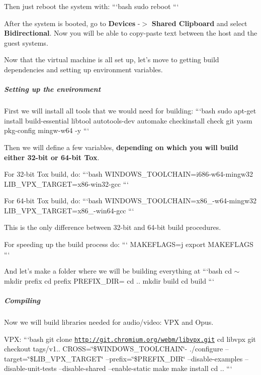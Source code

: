 Then just reboot the system with\+: ```bash sudo reboot ```

After the system is booted, go to {\bfseries Devices} -\/$>$ {\bfseries Shared Clipboard} and select {\bfseries Bidirectional}. Now you will be able to copy-\/paste text between the host and the guest systems.

Now that the virtual machine is all set up, let's move to getting build dependencies and setting up environment variables.

\label{_windows-cross-compile-environment}%
 \subparagraph*{Setting up the environment}

First we will install all tools that we would need for building\+: ```bash sudo apt-\/get install build-\/essential libtool autotools-\/dev automake checkinstall check git yasm pkg-\/config mingw-\/w64 -\/y ```

Then we will define a few variables, {\bfseries depending on which you will build either 32-\/bit or 64-\/bit Tox}.

For 32-\/bit Tox build, do\+: ```bash W\+I\+N\+D\+O\+W\+S\+\_\+\+T\+O\+O\+L\+C\+H\+A\+I\+N=i686-\/w64-\/mingw32 L\+I\+B\+\_\+\+V\+P\+X\+\_\+\+T\+A\+R\+G\+E\+T=x86-\/win32-\/gcc ```

For 64-\/bit Tox build, do\+: ```bash W\+I\+N\+D\+O\+W\+S\+\_\+\+T\+O\+O\+L\+C\+H\+A\+I\+N=x86\+\_-\/w64-\/mingw32 L\+I\+B\+\_\+\+V\+P\+X\+\_\+\+T\+A\+R\+G\+E\+T=x86\+\_-\/win64-\/gcc ```

This is the only difference between 32-\/bit and 64-\/bit build procedures.

For speeding up the build process do\+: ``` M\+A\+K\+E\+F\+L\+A\+G\+S=j export M\+A\+K\+E\+F\+L\+A\+G\+S ```

And let's make a folder where we will be building everything at ```bash cd $\sim$ mkdir prefix cd prefix P\+R\+E\+F\+I\+X\+\_\+\+D\+I\+R= cd .. mkdir build cd build ```

\label{_windows-cross-compile-compiling}%
 \subparagraph*{Compiling}

Now we will build libraries needed for audio/video\+: V\+P\+X and Opus.

V\+P\+X\+: ```bash git clone \href{http://git.chromium.org/webm/libvpx.git}{\tt http\+://git.\+chromium.\+org/webm/libvpx.\+git} cd libvpx git checkout tags/v1.. C\+R\+O\+S\+S=\char`\"{}\$\+W\+I\+N\+D\+O\+W\+S\+\_\+\+T\+O\+O\+L\+C\+H\+A\+I\+N\char`\"{}-\/ ./configure --target=\char`\"{}\$\+L\+I\+B\+\_\+\+V\+P\+X\+\_\+\+T\+A\+R\+G\+E\+T\char`\"{} --prefix=\char`\"{}\$\+P\+R\+E\+F\+I\+X\+\_\+\+D\+I\+R\char`\"{} --disable-\/examples --disable-\/unit-\/tests --disable-\/shared --enable-\/static make make install cd .. ```

